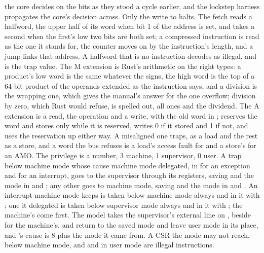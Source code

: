 \documentclass[journal,onecolumn,9pt]{IEEEtran}
\begin{document}
the core decides on the bits as they stood a cycle earlier, and the
lockstep harness propagates the core's decision across. Only the write to
 halts. The fetch reads a halfword, the upper half of its
word when bit 1 of the address is set, and takes a second when the
first's low two bits are both set; a compressed instruction is read
as the one it stands for, the counter moves on by the instruction's
length, and a jump links that address. A halfword that is no
instruction decodes as illegal, and is the trap value. The
M extension is Rust's arithmetic on the
right types: a product's low word is the same whatever the signs, the
high word is the top of a 64-bit product of the operands extended
as the instruction says, and a division is the wrapping one, which
gives the manual's answer for the one overflow; division by zero,
which Rust would refuse, is spelled out, all ones and the dividend.
The A extension is a read, the operation and a write, with the old
word in ;  reserves the word and 
stores only while it is reserved, writes 0 if it stored and 1 if not,
and uses the reservation up either way. A misaligned one traps,
 as a load and the rest as a store, and a word the bus
refuses is a load's access fault for  and a store's for
an AMO. The privilege is a number, 3 machine, 1 supervisor, 0 user. A
trap below machine mode whose cause machine mode delegated, in
 for an exception and  for an interrupt,
goes to the supervisor through its registers, saving  and
the mode in  and ; any other goes to machine mode,
saving  and the mode in  and . An
interrupt machine mode keeps is taken below machine mode always and in
it with ; one it delegated is taken below supervisor mode
always and in it with ; the machine's come first. The
model takes the supervisor's external line on , beside
 for the machine's.
 and  return to the saved mode and leave user
mode in its place, and 's cause is 8 plus the mode it came
from. A CSR the mode may not reach,  below machine mode, and
 and  in user mode are illegal instructions.
\end{document}
